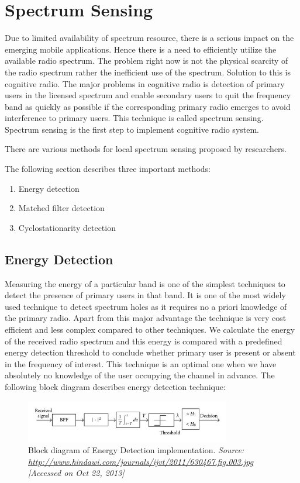 \chapter{Spectrum Sensing}

Due to limited availability of spectrum resource, there is a serious impact on 
the emerging mobile applications. Hence there is a need to efficiently utilize
the available radio spectrum. The problem right now is not the physical scarcity
of the radio spectrum rather the inefficient use of the spectrum. Solution to 
this is cognitive radio. The major problems in cognitive radio is detection of 
primary users in the licensed spectrum and enable secondary users to quit the 
frequency band as quickly as possible if the corresponding primary radio emerges
to avoid interference to primary users. This technique is called spectrum 
sensing. Spectrum sensing is the first step to implement cognitive radio system.

There are various methods for local spectrum sensing proposed by researchers.

The following section describes three important methods:
\begin{enumerate}
	\item Energy detection
	\item Matched filter detection 
	\item Cyclostationarity detection
\end{enumerate}

\section{Energy Detection}

Measuring the energy of a particular band is one of the simplest techniques to 
detect the presence of primary users in that band. It is one of the most widely
used technique to detect spectrum holes as it requires no a priori knowledge of 
the primary radio. Apart from this major advantage the technique is very cost 
efficient and less complex compared to other techniques. 
We calculate the energy of the received radio spectrum and this energy is 
compared with a predefined energy detection threshold to conclude whether 
primary user is present or absent in the frequency of interest. This technique 
is an optimal one when we have absolutely no knowledge of the user occupying the
channel in advance. The following block diagram describes energy detection 
technique:

\begin{figure}[h]
\centering
\includegraphics[width=0.8\textwidth]{energyDetector}
\caption[Block diagram of Energy Detection implementatio]{Block diagram 
of Energy Detection implementation.
\emph{Source:
\url{http://www.hindawi.com/journals/ijvt/2011/630467.fig.003.jpg} 
[Accessed on Oct 22, 2013]}}
\label{energyDetector}
\end{figure}

